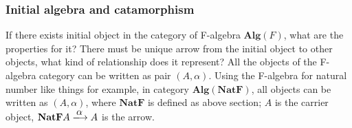 \documentclass{article}
\begin{document}
\begin{Exercise}
\end{Exercise}

\subsubsection{Initial algebra and catamorphism}

If there exists initial object in the category of F-algebra $\pmb{Alg}(F)$, what are the properties for it? There must be unique arrow from the initial object to other objects, what kind of relationship does it represent? All the objects of the F-algebra category can be written as pair $(A, \alpha)$. Using the F-algebra for natural number like things for example, in category $\pmb{Alg}(\mathbf{NatF})$, all objects can be written as $(A, \alpha)$, where $\mathbf{NatF}$ is defined as above section; $A$ is the carrier object, $\mathbf{NatF} A \arrowto{\alpha} A$ is the arrow.



\end{document}
